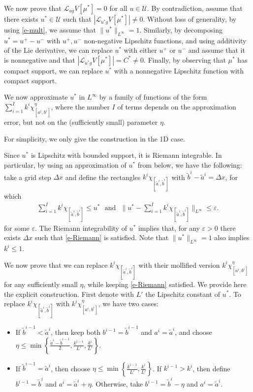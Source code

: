 \documentclass{article}
\newcommand{\dx}{\Delta x}
\renewcommand{\L}{\mathcal{L}}
\theoremstyle{definition}\newtheorem{remark}{Remark}
\newcommand{\eps}{\varepsilon}
\newcommand{\Pg}[1]{\left\{ #1 \right\}}
\newcommand{\bi}{\begin{itemize}}
\newcommand{\ei}{\end{itemize}}
\renewcommand{\i}{\item}
\newcommand{\bqn}{\begin{eqnarray}}
\newcommand{\eqn}{\end{eqnarray}}
\renewcommand{\r}[1]{\eqref{#1}}
\newcommand{\U}{\mathcal{U}}
\begin{document}
We now prove that $\L_{ug}V[\mu^*]=0$ for all $u\in \U$. By contradiction, assume that there exists $u^*\in \U$ such that $|\L_{u^*g}V[\mu^*]|\neq 0$. Without loss of generality, by using \r{e-mult}, we assume that $\|u^*\|_{L^\infty}=1$. Similarly, by decomposing $u^*=u^+-u^-$ with $u^+,u^-$ non-negative Lipschitz functions, and using additivity of the Lie derivative, we can replace $u^*$ with either $u^+$ or $u^-$ and assume that it is nonnegative and that $|\L_{u^*g}V[\mu^*]|= C^*\neq 0$. Finally, by observing that $\mu^*$ has compact support, we can replace $u^*$ with a nonnegative Lipschitz function with compact support.

We now approximate $u^*$ in $L^\infty$ by a family of functions of the form $\sum_{i=1}^I k^i\chi^{\eta}_{[a^i,b^i]}$, where the number $I$ of terms depends on the approximation error, but not on the (sufficiently small) parameter $\eta$. 

For simplicity, we only give the construction in the 1D case. 

Since $u^*$ is Lipschitz with bounded support, it is Riemann integrable. In particular, by using an approximation of $u^*$ from below, we have the following: take a grid step $\dx$ and define  the  rectangles $k^i\chi_{[\tilde a^i,\tilde b^i]}$ with $\tilde b^i-\tilde a^i=\dx$, for which
\bqn
\sum_{i=1}^I k^i\chi_{[\tilde a^i,\tilde b^i]}\leq u^*\mbox{~~and~~}\|u^*-\sum_{i=1}^I k^i\chi_{[\tilde a^i,\tilde b^i]}\|_{L^\infty}\leq \eps.\label{e-Riemann}
\eqn
for some $\eps$. The Riemann integrability of $u^*$ implies that, for any $\eps>0$ there exists $\dx$ such that \r{e-Riemann} is satisfied. Note that $\|u^*\|_{L^\infty}=1$ also implies $k^i\leq 1$.

We now prove that we can replace $k^i\chi_{[\tilde a^i,\tilde b^i]}$ with their mollified version $k^i\chi^\eta_{[a^i,b^i]}$ for any sufficiently small $\eta$, while keeping \r{e-Riemann} satisfied. We provide here the explicit construction. First denote with $L'$ the Lipschitz constant of $u^*$. To replace $k^i\chi_{[\tilde a^i,\tilde b^i]}$ with $k^i\chi^\eta_{[a^i,b^i]}$, we have two cases:
\bi
\i If $\tilde b^{i-1}<\tilde a^i$, then keep both $b^{i-1}=\tilde b^{i-1}$ and $a^i=\tilde a^i$, and choose $\eta\leq \min\Pg{\frac{\tilde a^i-\tilde b^{i-1}}2,\frac{k^{i-1}}{L'},\frac{k^{i}}{L'}}$.
\i If $\tilde b^{i-1}=\tilde a^i$, then choose $\eta\leq\min\Pg{\frac{k^{i-1}}{L'},\frac{k^{i}}{L'}}$. If $k^{i-1}>k^{i}$, then define $b^{i-1}=\tilde b^i$ and $a^i=\tilde a^i+\eta$. Otherwise, take $b^{i-1}=\tilde b^i-\eta$ and $a^i=\tilde a^i$.
\ei
\end{document}
